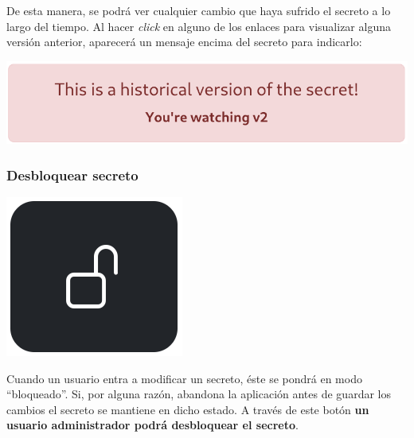 \documentclass{\ClassPath/viu-tfm-template}
\begin{document}
De esta manera, se podrá ver cualquier cambio que haya sufrido el secreto a lo largo del tiempo. Al hacer \textit{click} en alguno de los enlaces para visualizar alguna versión anterior, aparecerá un mensaje encima del secreto para indicarlo:
\vspace{-8pt}
\begin{center}
    \includegraphics[width=0.6\linewidth]{img/history2.png}
\end{center}

\subsubsection*{Desbloquear secreto}
{
\begin{minipage}{0.1\linewidth}
    \includegraphics[width=\linewidth]{img/unlock.png}
\end{minipage}
\hspace{0.5cm}
\begin{minipage}{0.9\linewidth}
    Cuando un usuario entra a modificar un secreto, éste se pondrá en modo “bloqueado”. Si, por alguna razón, abandona la aplicación antes de guardar los cambios el secreto se mantiene en dicho estado. A través de este botón \textbf{un usuario administrador podrá desbloquear el secreto}.
\end{minipage}
}
\end{document}
